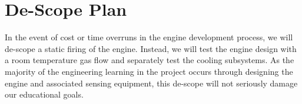 \documentclass{article}
\begin{document}
\section*{De-Scope Plan}
In the event of cost or time overruns in the engine development process, we will de-scope a static firing of the engine. Instead, we will test the engine design with a room temperature gas flow and separately test the cooling subsystems. As the majority of the engineering learning in the project occurs through designing the engine and associated sensing equipment, this de-scope will not seriously damage our educational goals. 
\end{document}
